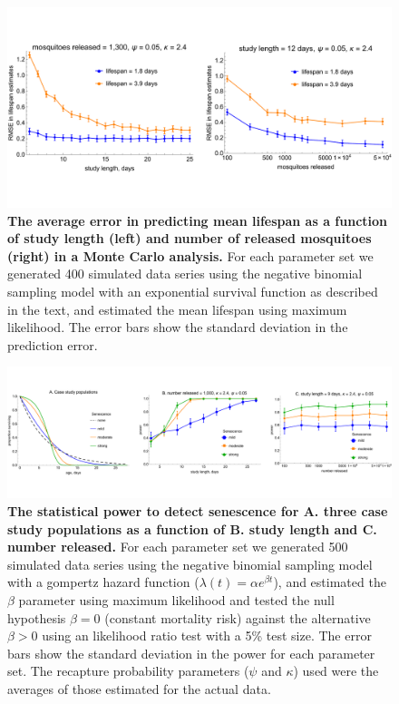 \documentclass[12pt]{article}
\begin{document}
{\begin{figure}[ht]
	\centerline{\includegraphics[width=1.25\textwidth]{./Figure_files/mrr_mcPowerAnalysis.pdf}}
	\caption{\textbf{The average error in predicting mean lifespan as a function of study length (left) and number of released mosquitoes (right) in a Monte Carlo analysis.} For each parameter set we generated 400 simulated data series using the negative binomial sampling model with an exponential survival function as described in the text, and estimated the mean lifespan using maximum likelihood. The error bars show the standard deviation in the prediction error.}
	\label{fig:mrr_mcPowerAnalysis}
\end{figure}


\begin{figure}[ht]
	\centerline{\includegraphics[width=1.25\textwidth]{./Figure_files/mrr_mcPowerAnalysis_senescence.pdf}}
	\caption{\textbf{The statistical power to detect senescence for A. three case study populations as a function of B. study length and C. number released.} For each parameter set we generated 500 simulated data series using the negative binomial sampling model with a gompertz hazard function ($\lambda(t) = \alpha e^{\beta t}$), and estimated the $\beta$ parameter using maximum likelihood and tested the null hypothesis $\beta=0$ (constant mortality risk) against the alternative $\beta>0$ using an likelihood ratio test with a 5\% test size. The error bars show the standard deviation in the power for each parameter set. The recapture probability parameters ($\psi$ and $\kappa$) used were the averages of those estimated for the actual data.}
	\label{fig:mrr_mcPowerAnalysis_senescence}
\end{figure}


}
\end{document}
